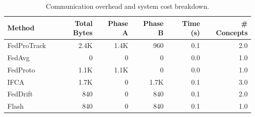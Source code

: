 \begin{table}[t]
\centering
\caption{Communication overhead and system cost breakdown.}
\label{tab:overhead}
\begin{tabular}{lrrrrr}
\toprule
Method & Total Bytes & Phase A & Phase B & Time (s) & \# Concepts \\
\midrule
FedProTrack & 2.4K & 1.4K & 960 & 0.1 & 2.0 \\
FedAvg & 0 & 0 & 0 & 0.0 & 1.0 \\
FedProto & 1.1K & 1.1K & 0 & 0.0 & 1.0 \\
IFCA & 1.7K & 0 & 1.7K & 0.1 & 3.0 \\
FedDrift & 840 & 0 & 840 & 0.1 & 2.0 \\
Flash & 840 & 0 & 840 & 0.1 & 1.0 \\
\bottomrule
\end{tabular}
\end{table}